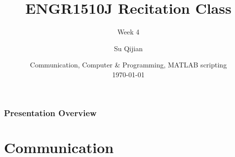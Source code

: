\documentclass[
	11pt, %
]{beamer}
\title[Short Title]{ENGR1510J Recitation Class} %
\subtitle{Week 4} %
\author[James Cook \and Roald Amundsen]{Su Qijian} %
\institute[UC]{UM-SJTU Joint Institute} %
\date[\today]{Communication, Computer \& Programming, MATLAB scripting \\ \today} %
\begin{document}

\begin{frame}
	\titlepage %
\end{frame}



\begin{frame}
	\frametitle{Presentation Overview} %
	
	\tableofcontents %
\end{frame}


\section{Communication} %
\end{document}
